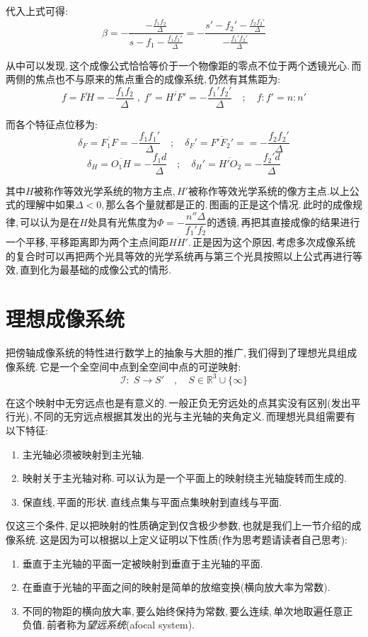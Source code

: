 代入上式可得:
\[\beta=-\frac{-\frac{f_1f_2}{\varDelta}}{s-f_1-\frac{f_1f_1'}{\varDelta}}=-\frac{s'-f_2'-\frac{f_2f_2'}{\varDelta}}{-\frac{f_1'f_2'}{\varDelta}}\]

从中可以发现,\,这个成像公式恰恰等价于一个物像距的零点不位于两个透镜光心.\,而两侧的焦点也不与原来的焦点重合的成像系统,\,仍然有其焦距为:
\[f=\overline{FH}=-\frac{f_1f_2}{\varDelta}\;,\; f'=\overline{H'F'}=-\frac{f_1'f_2'}{\varDelta}\quad ;\quad f:f'=n:n'\]

而各个特征点位移为:
\[\delta_F=\overline{F_1F}=-\frac{f_1f_1'}{\varDelta}\quad;\quad \delta_F'=\overline{F'F_2'}==-\frac{f_2f_2'}{\varDelta}\]
\[\delta_H=\overline{O_1H}=-\frac{f_1d }{\varDelta}\quad;\quad \delta_H'=\overline{H'O_2}=-\frac{f_2' d}{\varDelta}\]

其中\(H\)被称作等效光学系统的物方主点,\,\(H'\)被称作等效光学系统的像方主点.以上公式的理解中如果\(\varDelta<0\),\,那么各个量就都是正的.\,图画的正是这个情况.\,此时的成像规律,\,可以认为是在\(H\)处具有光焦度为\(\varPhi=-\dfrac{n''\varDelta}{f_1'f_2}\)的透镜,\,再把其直接成像的结果进行一个平移,\,平移距离即为两个主点间距\(\overline{HH'}\).\,正是因为这个原因,\,考虑多次成像系统的复合时可以再把两个光具等效的光学系统再与第三个光具按照以上公式再进行等效,\,直到化为最基础的成像公式的情形.

\section{理想成像系统}
把傍轴成像系统的特性进行数学上的抽象与大胆的推广,\,我们得到了理想光具组成像系统.\,它是一个全空间中点到全空间中点的可逆映射:
\[\mathcal{I}:\; S\to S'\quad,\quad S\in\mathbb{R}^3\cup\{\infty\}\]

在这个映射中无穷远点也是有意义的.\,一般正负无穷远处的点其实没有区别(发出平行光),\,不同的无穷远点根据其发出的光与主光轴的夹角定义.\,而理想光具组需要有以下特征:
\begin{enumerate}
	\item 主光轴必须被映射到主光轴.
	\item 映射关于主光轴对称.\,可以认为是一个平面上的映射绕主光轴旋转而生成的.\,
	\item 保直线,\,平面的形状.\,直线点集与平面点集映射到直线与平面.
\end{enumerate}

仅这三个条件,\,足以把映射的性质确定到仅含极少参数,\,也就是我们上一节介绍的成像系统.\,这是因为可以根据以上定义证明以下性质(作为思考题请读者自己思考):
\begin{enumerate}
	\item 垂直于主光轴的平面一定被映射到垂直于主光轴的平面.
	\item 在垂直于光轴的平面之间的映射是简单的放缩变换(横向放大率为常数).
	\item 不同的物距的横向放大率,\,要么始终保持为常数,\,要么连续,\,单次地取遍任意正负值.\,前者称为\emph{望远系统}(afocal system).
\end{enumerate}

